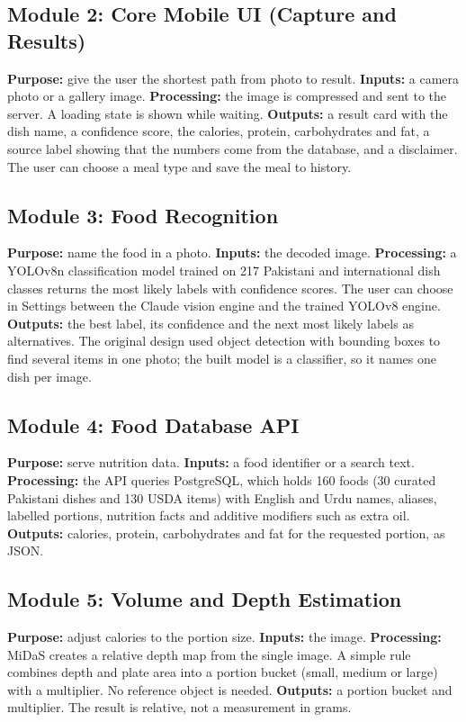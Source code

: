 \subsection{Module 2: Core Mobile UI (Capture and Results)}
\textbf{Purpose:} give the user the shortest path from photo to result. \textbf{Inputs:} a camera
photo or a gallery image. \textbf{Processing:} the image is compressed and sent to the server. A
loading state is shown while waiting. \textbf{Outputs:} a result card with the dish name, a
confidence score, the calories, protein, carbohydrates and fat, a source label showing that the
numbers come from the database, and a disclaimer. The user can choose a meal type and save the
meal to history.

\subsection{Module 3: Food Recognition}
\textbf{Purpose:} name the food in a photo. \textbf{Inputs:} the decoded image. \textbf{Processing:}
a YOLOv8n classification model trained on 217 Pakistani and international dish classes returns the
most likely labels with confidence scores. The user can choose in Settings between the Claude vision
engine and the trained YOLOv8 engine. \textbf{Outputs:} the best label, its confidence and the next
most likely labels as alternatives. The original design used object detection with bounding boxes to
find several items in one photo; the built model is a classifier, so it names one dish per image.

\subsection{Module 4: Food Database API}
\textbf{Purpose:} serve nutrition data. \textbf{Inputs:} a food identifier or a search text.
\textbf{Processing:} the API queries PostgreSQL, which holds 160 foods (30 curated Pakistani dishes
and 130 USDA items) with English and Urdu names, aliases, labelled portions, nutrition facts and
additive modifiers such as extra oil. \textbf{Outputs:} calories, protein, carbohydrates and fat for
the requested portion, as JSON.

\subsection{Module 5: Volume and Depth Estimation}
\textbf{Purpose:} adjust calories to the portion size. \textbf{Inputs:} the image. \textbf{Processing:}
MiDaS creates a relative depth map from the single image. A simple rule combines depth and plate
area into a portion bucket (small, medium or large) with a multiplier. No reference object is needed.
\textbf{Outputs:} a portion bucket and multiplier. The result is relative, not a measurement in grams.

